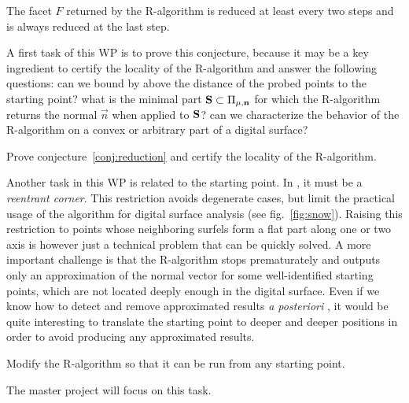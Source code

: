\begin{Conjecture}
  \label{conj:reduction}
  The facet $F$ returned by the R-algorithm is reduced at least every two steps and
  is always reduced at the last step.  
\end{Conjecture}

A first task of this WP is to prove this conjecture, because it may be
a key ingredient to certify the locality of the R-algorithm and answer
the following questions: can we bound by above the distance of the probed
points to the starting point? 
what is the minimal part $\mathbf{S} \subset \Pi_{\mu,\mathbf{n}}$ for which the
R-algorithm returns the normal $\vec{n}$ when applied to $\mathbf{S}$?
can we characterize the behavior of the R-algorithm on a convex or arbitrary
part of a digital surface?

\begin{Task}
  \label{task:reduction}
  Prove conjecture~\ref{conj:reduction} and certify the locality of the R-algorithm. 
\end{Task}

Another task in this WP is related to the starting point. In \cite{LPRJMIV2017},
it must be a \emph{reentrant corner}. This restriction avoids degenerate cases, but
limit the practical usage of the algorithm for digital surface analysis
(see fig.~\ref{fig:snow}). Raising this restriction to points whose neighboring
surfels form a flat part along one or two axis is however just a technical
problem that can be quickly solved. A more important challenge is that the R-algorithm
stops prematurately and outputs only an approximation of the normal vector for some
well-identified starting points, which are not located deeply enough in the digital
surface. Even if we know how to detect and remove approximated results
\emph{a posteriori} \cite{LPRJMIV2017}, it would be quite interesting to translate
the starting point to deeper and deeper positions in order to avoid producing any
approximated results.

\begin{Task}
  \label{task:start}
  Modify the R-algorithm so that it can be run from any starting point. 
\end{Task}

The master project will focus on this task. %

